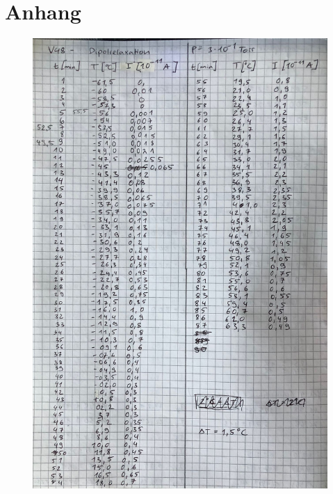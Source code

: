 \section{Anhang}
\label{sec:anhang}

\begin{figure}
    \centering
    \includegraphics[width=\textwidth]{bilder/Anhang_1.jpeg}

\end{figure}
